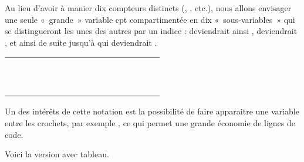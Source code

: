 	Au lieu d’avoir à manier dix compteurs distincts
	(, , etc.), nous allons
	envisager une seule «~grande~» variable cpt compartimentée en dix
	«~sous-variables~» qui se distingueront les unes des autres par un
	indice :  deviendrait ainsi
	,  deviendrait
	, et ainsi de suite jusqu’à
	 qui deviendrait .

	\begin{center}
		\tablehead{}
		\begin{supertabular}{m{0.588cm}m{0.80cm}m{0.80cm}m{0.80cm}m{0.80cm}m{0.80cm}m{0.80cm}m{0.80cm}m{0.80cm}m{0.80cm}m{1.2989999cm}}
			~ &
			\centering  {} &
			\centering  {} &
			\centering  {} &
			\centering  {} &
			\centering  {} &
			\centering  {} &
			\centering  {} &
			\centering  {} &
			\centering  {} &
			\centering\arraybslash 
			\\\hhline{~----------}
			 & 
			 &
			 &
			 &
			 &
			 &
			 &
			 &
			 &
			 &
			\\\hhline{~----------}
		\end{supertabular}
	\end{center}

	Un des intérêts de cette notation est la possibilité de faire apparaitre
	une variable entre les crochets, par exemple
	, ce qui permet une grande économie de lignes
	de code.
	
	Voici la version avec tableau.


